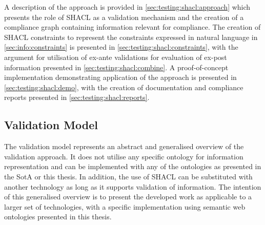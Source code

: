 A description of the approach is provided in \autoref{sec:testing:shacl:approach} which presents the role of SHACL as a validation mechanism and the creation of a compliance graph containing information relevant for compliance. The creation of SHACL constraints to represent the constraints expressed in natural language in \autoref{sec:info:constraints} is presented in \autoref{sec:testing:shacl:constraints}, with the argument for utilisation of ex-ante validations for evaluation of ex-post information presented in \autoref{sec:testing:shacl:combine}.
A proof-of-concept implementation demonstrating application of the approach is presented in \autoref{sec:testing:shacl:demo}, with the creation of documentation and compliance reports presented in \autoref{sec:testing:shacl:reports}.

\subsection{Validation Model}\label{sec:testing:shacl:approach}
The validation model represents an abstract and generalised overview of the validation approach. It does not utilise any specific ontology for information representation and can be implemented with any of the ontologies as presented in the SotA or this thesis. In addition, the use of SHACL can be substituted with another technology as long as it supports validation of information.
The intention of this generalised overview is to present the developed work as applicable to a larger set of technologies, with a specific implementation using semantic web ontologies presented in this thesis.

